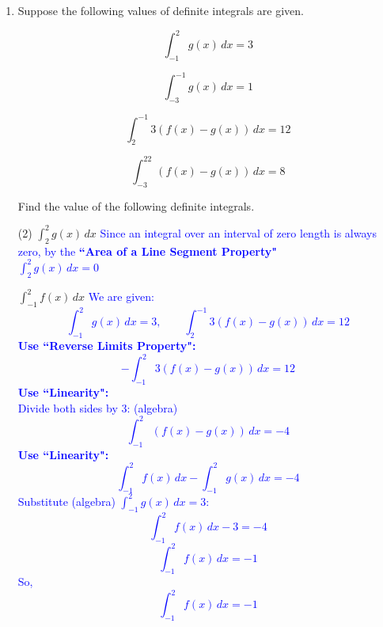 \documentclass[11pt]{article}
\newcommand{\tasksA}[2]{\begin{tasks}(#1) #2 \end{tasks}} %
\begin{document}
\begin{enumerate}
\begin{enumerate}
\begin{enumerate}
        {\color{blue}Solution:
        
        $$\int_2^{10} p(t)dt$$}

        \vfill
    \end{enumerate}

    \vfill
\end{enumerate}



\newpage


\item Suppose the following values of definite integrals are given.

\[\int_{-1}^{2}g(x)\,dx=3\]

\[\int_{-3}^{-1}g(x)\,dx=1\]

\[\int_2^{-1}3(f(x)-g(x))\,dx=12\]

\[\int_{-3}^22(f(x)-g(x))\,dx=8\]

Find the value of the following definite integrals.

\tasksA{2}{
\task $\displaystyle\int_2^2 g(x)\, dx$
\textcolor{blue}{
Since an integral over an interval of zero length is always zero, by the \textbf{``Area of a Line Segment Property"}
\\
 $\displaystyle\int_2^2 g(x)\, dx = 0$
}

\task $\displaystyle\int_{-1}^2 f(x)\, dx$
\textcolor{blue}{
We are given:
\[
\int_{-1}^{2} g(x)\,dx = 3,
\qquad
\int_{2}^{-1} 3(f(x)-g(x))\,dx = 12
\]
\textbf{Use ``Reverse Limits Property":}
\[
-\int_{-1}^{2} 3(f(x)-g(x))\,dx = 12
\]
\textbf{Use ``Linearity":}\\
Divide both sides by 3: (algebra)
\[
\int_{-1}^{2} (f(x)-g(x))\,dx = -4
\]
\textbf{Use ``Linearity":}
\[
\int_{-1}^{2} f(x)\,dx - \int_{-1}^{2} g(x)\,dx = -4
\]
Substitute (algebra) \(\int_{-1}^{2} g(x)\,dx = 3\):
\[
\int_{-1}^{2} f(x)\,dx - 3 = -4
\]
\[
\int_{-1}^{2} f(x)\,dx = -1
\]
So, 
\[
\displaystyle\int_{-1}^2 f(x)\, dx = -1
\]
}

}
\end{enumerate}
\end{document}
